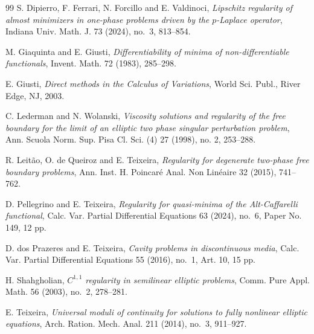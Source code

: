 \documentclass[reqno,11pt]{amsart}
\newcommand{\1}{\mathds{1}}  %
\numberwithin{equation}{section}
\begin{document}
\begin{thebibliography}{99}
 S. Dipierro, F. Ferrari, N. Forcillo and E. Valdinoci, 
\textit{Lipschitz regularity of almost minimizers in one-phase problems driven by the $p$-Laplace operator}, 
Indiana Univ. Math. J. 73 (2024), no.~3, 813--854.

 M. Giaquinta and E. Giusti, 
\textit{Differentiability of minima of non-differentiable functionals}, 
Invent. Math. 72 (1983), 285--298.

 E. Giusti, 
\textit{Direct methods in the Calculus of Variations}, 
World Sci. Publ., River Edge, NJ, 2003.

 C. Lederman and N. Wolanski,
\textit{Viscosity solutions and regularity of the free boundary for the limit of an elliptic two phase singular perturbation problem}, 
Ann. Scuola Norm. Sup. Pisa Cl. Sci. (4) 27 (1998), no. 2, 253--288.

 R. Leitão, O. de Queiroz and E. Teixeira, 
\textit{Regularity for degenerate two-phase free boundary problems}, 
Ann. Inst. H. Poincaré Anal. Non Linéaire 32 (2015), 741--762.

 D. Pellegrino and E. Teixeira, 
\textit{Regularity for quasi-minima of the Alt-Caffarelli functional}, 
Calc. Var. Partial Differential Equations 63 (2024), no.~6, Paper No. 149, 12 pp.

 D. dos Prazeres and E. Teixeira, 
\textit{Cavity problems in discontinuous media}, 
Calc. Var. Partial Differential Equations 55 (2016), no.~1, Art. 10, 15 pp.

 H. Shahgholian, 
\textit{$C^{1,1}$ regularity in semilinear elliptic problems}, 
Comm. Pure Appl. Math. 56 (2003), no.~2, 278--281.

 E. Teixeira, 
\textit{Universal moduli of continuity for solutions to fully nonlinear elliptic equations}, 
Arch. Ration. Mech. Anal. 211 (2014), no.~3, 911--927.

\end{thebibliography}
\end{document}
